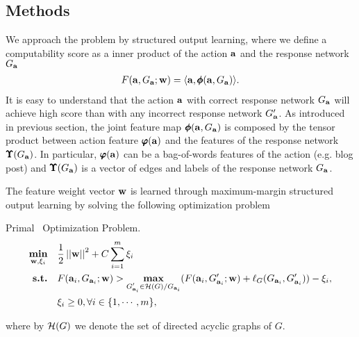 {%
\subsection{Methods}
We approach the problem by structured output learning, where we define a computability score as a inner product of the action $\mathbf {a}$ and the response network $G_{\mathbf {a}}$
\begin{align*}
	F(\mathbf {a},G_{\mathbf {a}};\mathbf {w}) = \langle \mathbf {a}, \pmb \phi(\mathbf {a},G_{\mathbf {a}}) \rangle.
\end{align*}
It is easy to understand that the action $\mathbf {a}$ with correct response network $G_{\mathbf {a}}$ will achieve high score than with any incorrect response network $G_{\mathbf {a}}'$.
As introduced in previous section, the joint feature map $\pmb \phi(\mathbf {a},G_{\mathbf {a}})$ is composed by the tensor product between action feature $\pmb \varphi(\mathbf {a})$ and the features of the response network $\pmb \Upsilon(G_{\mathbf {a}})$.
In particular, $\pmb \varphi(\mathbf {a})$ can be a bag-of-words features of the action (e.g. blog post) and $\pmb \Upsilon(G_{\mathbf {a}})$ is a vector of edges and labels of the response network $G_{\mathbf {a}}$.

The feature weight vector $\mathbf {w}$ is learned through maximum-margin structured output learning by solving the following optimization problem
\begin{definition}{Primal \spin\ Optimization Problem.}
\begin{align*}
	\underset{\mathbf {w},\mathbf{\xi}_i}{\textbf{min}} &\quad \frac{1}{2}\left|\left| \mathbf {w} \right|\right|^2+C\sum_{i=1}^{m}\xi_i\\
	\textbf{s.t.} &\quad F(\mathbf {a}_i,G_{\mathbf {a}_i};\mathbf {w}) > \underset{\substack{G_{\mathbf {a}_i}'\in\mathcal{H}(G)/G_{\mathbf {a}_i}}}{\textbf{max}}(F(\mathbf {a}_i,G_{\mathbf {a}_i}';\mathbf {w})+\mathbf {\ell}_{G}(G_{\mathbf {a}_i},G_{\mathbf {a}_i}')) - \xi_i,\\
	&\quad \xi_i\ge0, \forall i\in\{1,\cdots,m\},
\end{align*}
\end{definition}
where by $\mathcal{H}(G)$ we denote the set of directed acyclic graphs of $G$.

}
